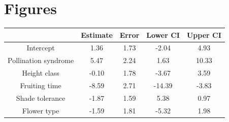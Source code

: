 \documentclass{article}\usepackage[]{graphicx}\usepackage[]{color}
\begin{document}
\section{Figures}

\begin{table}
\begin{tabular}{|c|c|c|c|c|}
\hline
 &Estimate&Error&Lower CI& Upper CI\\
 \hline
Intercept&1.36&1.73&-2.04&4.93\\
\hline
Pollination syndrome&5.47&2.24&1.63&10.33\\
\hline
Height class&-0.10&1.78&-3.67&3.59\\
\hline
Fruiting time&-8.59&2.71&-14.39&-3.83\\
\hline
Shade tolerance&-1.87&1.59&5.38&0.97\\
\hline
Flower type&-1.59&1.81&-5.32&1.98\\
\hline

\end{tabular}
\end{table}
\end{document}
